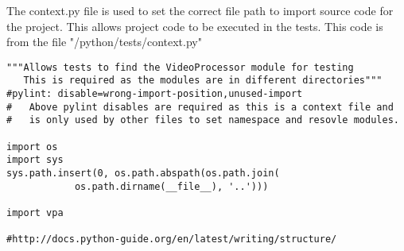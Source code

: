 The context.py file is used to set the correct file path to import source code for the project. This allows project code to be executed in the tests. This code is from the file "/python/tests/context.py"

\begin{verbatim}
"""Allows tests to find the VideoProcessor module for testing
   This is required as the modules are in different directories"""
#pylint: disable=wrong-import-position,unused-import
#   Above pylint disables are required as this is a context file and
#   is only used by other files to set namespace and resovle modules.

import os
import sys
sys.path.insert(0, os.path.abspath(os.path.join(
			os.path.dirname(__file__), '..')))

import vpa

#http://docs.python-guide.org/en/latest/writing/structure/
\end{verbatim}